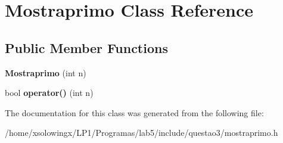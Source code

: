 \hypertarget{classMostraprimo}{}\section{Mostraprimo Class Reference}
\label{classMostraprimo}
\subsection*{Public Member Functions}
\begin{DoxyCompactItemize}
\item 
\mbox{\label{classMostraprimo_a1ec196237bd7c4735b3521daedc9af15}} 
{\bfseries Mostraprimo} (int n)
\item 
\mbox{\label{classMostraprimo_a6b78ddcc0a9219c65741209e158a6ef2}} 
bool {\bfseries operator()} (int n)
\end{DoxyCompactItemize}


The documentation for this class was generated from the following file\+:\begin{DoxyCompactItemize}
\item 
/home/xsolowingx/\+L\+P1/\+Programas/lab5/include/questao3/mostraprimo.\+h\end{DoxyCompactItemize}
